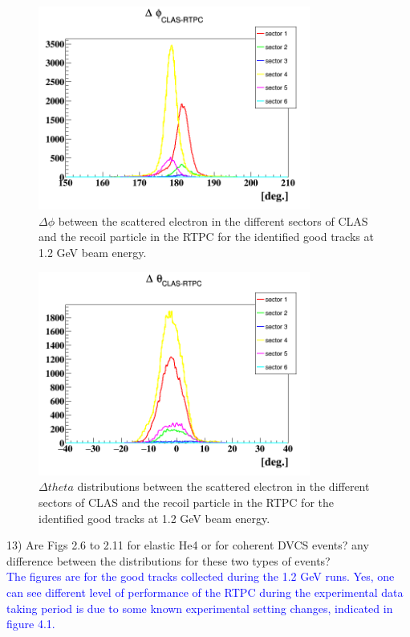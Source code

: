 \begin{figure}[h!]
\centering
\includegraphics[height=6.7cm]{fig/delta_phi_sec.png}
\caption{ $\Delta \phi$ between the scattered electron in the different sectors 
of CLAS and the recoil particle in the RTPC for the identified good tracks at 
1.2 GeV beam energy.}
\label{fig:delta_phi_sec}
 \end{figure}


\begin{figure}[h!]
\centering
\includegraphics[height=6.7cm]{fig/delta_theta_sec.png}
\caption{$\Delta theta$ distributions between the scattered electron in the 
different sectors of CLAS and the recoil particle in the RTPC for the 
identified good tracks at 1.2 GeV beam energy.}
\label{fig:delta_theta_sec}
 \end{figure}



13) Are Figs 2.6 to 2.11 for elastic He4 or for coherent DVCS events? any 
difference between the distributions for these two types of events?\\

\textcolor{blue}{ The figures are for the good tracks collected during the 1.2 
GeV runs. Yes, one can see different level of performance of the RTPC during 
the experimental data taking period is due to some known experimental setting 
changes, indicated in figure 4.1.}\\


